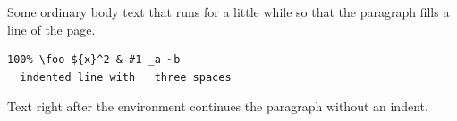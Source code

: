 \documentclass{article}
\begin{document}
Some ordinary body text that runs for a little while so that the paragraph fills a line of the page.
\begin{verbatim}
100% \foo ${x}^2 & #1 _a ~b
  indented line with   three spaces
\end{verbatim}
Text right after the environment continues the paragraph without an indent.
\end{document}
